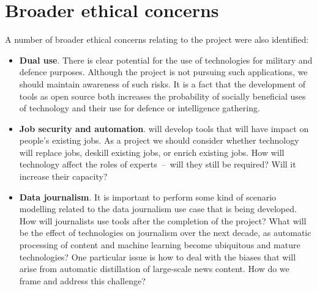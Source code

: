 \section{Broader ethical concerns}
\label{sec:broader}

A number of broader ethical concerns relating to the project were also identified:
\begin{itemize} 
\item
\textbf{Dual use}. There is clear potential for the use of \project technologies for military and defence purposes.  Although the project is not pursuing such applications, we should maintain awareness of such risks.  It is a fact that the development of \project tools as open source both increases the probability of socially beneficial uses of \project technology and their use for defence or intelligence gathering.  
\item
\textbf{Job security and automation}. \project will develop tools that will have impact on people's existing jobs.  As a project we should consider whether \project technology will replace jobs, deskill existing jobs, or enrich existing jobs.  How will \project technology affect the roles of experts~--~will they still be required?   Will it increase their capacity?
\item 
\textbf{Data journalism}.  It is important to perform some kind of scenario modelling related to the data journalism use case that is being developed.  How will journalists use \project tools after the completion of the project?  What will be the effect of \project technologies on journalism over the next decade, as automatic processing of content and machine learning become ubiquitous and mature technologies?  One  particular issue is how to deal with the biases that will arise from automatic distillation of large-scale news content. How do we frame and address this challenge?
\end{itemize}
